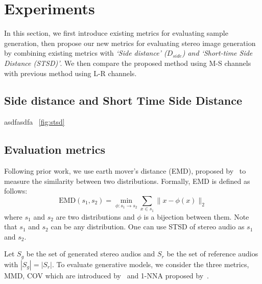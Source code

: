 \section{Experiments}
\label{sec:experiment}

In this section, we first introduce existing metrics for evaluating sample generation, then propose our new metrics for evaluating stereo image generation by combining existing metrics with \textit{`Side distance' ($D_{side}$) and `Short-time Side Distance (STSD)'}. We then compare the proposed method using M-S channels with previous method using L-R channels.

\subsection{Side distance and Short Time Side Distance}
\label{subsec:s-distance}

asdfasdfa ~\ref{fig:stsd}
\subsection{Evaluation metrics}
\label{subsec:metric}
Following prior work, we use earth mover's distance (EMD), proposed by~\cite{emd} to measure the similarity between two distributions. Formally, EMD is defined as follows:
\begin{equation}
    \text{EMD}(s_1, s_2) = \min_{\phi: s_1\to s_2} \sum_{x\in s_1} \|x-\phi(x)\|_2 \nonumber
\end{equation}
where $s_1$ and $s_2$ are two distributions and $\phi$ is a bijection between them. Note that $s_1$ and $s_2$ can be any distribution. One can use STSD of stereo audio as $s_1$ and $s_2$.

Let $S_g$ be the set of generated stereo audios and $S_r$ be the set of reference audios with $|S_g| = |S_r|$. To evaluate generative models, we consider the three metrics, MMD, COV which are introduced by~\cite{achlioptas} and 1-NNA proposed by~\cite{1-nna}.

